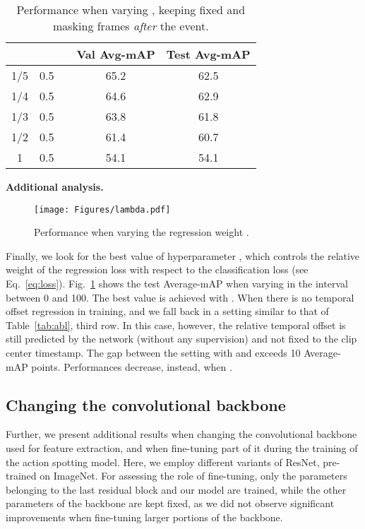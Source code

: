 \documentclass[a4paper,conference]{IEEEtran}
\newcommand{\tit}[1]{\smallbreak\noindent\textbf{#1.}}
\begin{document}
\begin{table}[t]
\centering
\caption{Performance when varying , keeping  fixed and masking frames \textit{after} the event.}
\begin{tabular}{ccccc}
    \toprule 
     &  & & Val Avg-mAP & Test Avg-mAP \\
    \midrule
    1/5 & 0.5 & & 65.2 & 62.5 \\
    1/4 & 0.5 & & 64.6 & 62.9 \\
    1/3 & 0.5 & & 63.8 & 61.8 \\
    1/2 & 0.5 & & 61.4 & 60.7 \\
    1 & 0.5 & & 54.1 & 54.1 \\
    \bottomrule
\end{tabular}
\label{tab:mask_after}
\end{table}

\tit{Additional analysis}
\begin{figure}[t]
\centering
\texttt{[image: Figures/lambda.pdf]}
\caption{Performance when varying the regression weight .}
\label{fig:lambda}
\end{figure}
Finally, we look for the best value of hyperparameter , which controls the relative weight of the regression loss with respect to the classification loss (see Eq.~\ref{eq:loss}). Fig.~\ref{fig:lambda} shows the test Average-mAP when varying  in the interval between 0 and 100. The best value is achieved with . When  there is no temporal offset regression in training, and we fall back in a setting similar to that of Table~\ref{tab:abl}, third row. In this case, however, the relative temporal offset is still predicted by the network (without any supervision) and not fixed to the clip center timestamp. The gap between the setting with  and  exceeds 10 Average-mAP points. Performances decrease, instead, when .

\subsection{Changing the convolutional backbone}
Further, we present additional results when changing the convolutional backbone used for feature extraction, and when fine-tuning part of it during the training of the action spotting model.
Here, we employ different variants of ResNet, pre-trained on ImageNet. For assessing the role of fine-tuning, only the parameters belonging to the last residual block and our model are trained, while the other parameters of the backbone are kept fixed, as we did not observe significant improvements when fine-tuning larger portions of the backbone.
\end{document}
